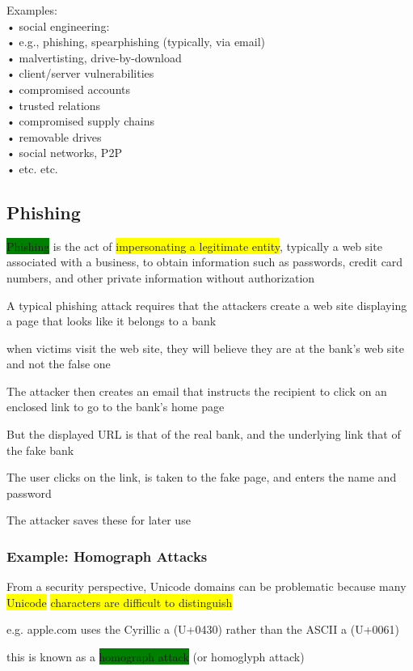 \documentclass[]{project_plan}
\begin{document}
Examples:\\
• social engineering:\\
• e.g., phishing, spearphishing (typically, via email)\\
• malvertisting, drive-by-download\\
• client/server vulnerabilities\\
• compromised accounts\\
• trusted relations\\
• compromised supply chains\\
• removable drives\\
• social networks, P2P\\
• etc. etc.

\subsection{Phishing}
\colorbox{green}{Phishing} is the act of \colorbox{yellow}{impersonating a legitimate entity}, typically a web site associated with a
business, to obtain information such as passwords, credit card numbers, and other private
information without authorization

A typical phishing attack requires that the attackers create a web site displaying a page
that looks like it belongs to a bank

when victims visit the web site, they will believe they are at the bank’s web site and not the false one

The attacker then creates an email that instructs the recipient to click on an enclosed link to go
to the bank’s home page

But the displayed URL is that of the real bank, and the underlying link that of the fake bank

The user clicks on the link, is taken to the fake page, and enters the name and password

The attacker saves these for later use

\subsubsection{Example: Homograph Attacks}
From a security perspective, Unicode domains can be problematic because many \colorbox{yellow}{Unicode}
\colorbox{yellow}{characters are difficult to distinguish}

e.g. apple.com uses the Cyrillic a (U+0430) rather than the ASCII a (U+0061)

this is known as a \colorbox{green}{homograph attack} (or homoglyph attack)
\end{document}
